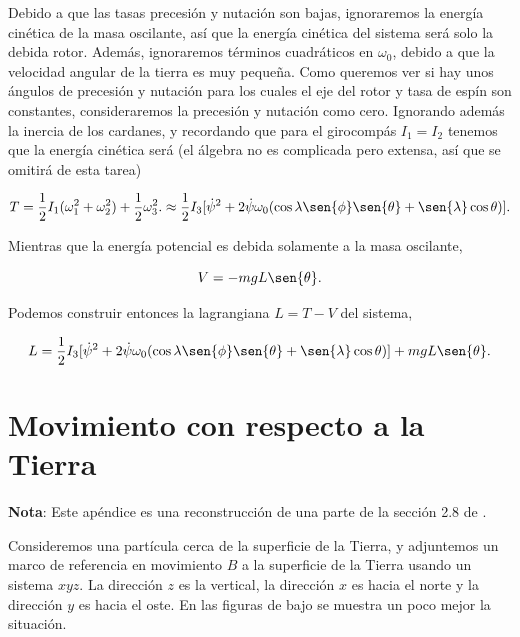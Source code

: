 \documentclass[a4paper,10pt]{article}
\numberwithin{equation}{section}
\begin{document}
Debido a que las tasas precesión y nutación son bajas, ignoraremos la energía 
cinética de la masa oscilante, así que la energía cinética del sistema será solo 
la debida rotor. Además, ignoraremos términos cuadráticos en $\omega_0$, debido a que 
la velocidad angular de la tierra es muy pequeña. Como queremos ver si hay unos 
ángulos de precesión y nutación para los cuales el eje del rotor y tasa de espín 
son constantes, consideraremos la precesión y nutación como cero. Ignorando además 
la inercia de los cardanes, y recordando que para el girocompás $I_1=I_2$ tenemos 
que la energía cinética será (el álgebra no es complicada pero extensa, así que 
se omitirá de esta tarea)

\begin{equation}
 T = \frac{1}{2}I_1 (\omega_1^2 + \omega_2^2) + \frac{1}{2}\omega_3^2. \approx 
 \frac{1}{2}I_3[\dot{\psi}^2 + 2\dot{\psi}\omega_0(\cos{\lambda}\sen{\phi}\sen{\theta} + 
 \sen{\lambda}\cos{\theta})].
\end{equation}

Mientras que la energía potencial es debida solamente a la masa oscilante,

\begin{equation}
 V = - mgL\sen{\theta}.
\end{equation}

Podemos construir entonces la lagrangiana $L = T - V$ del sistema,

\begin{equation}
 L = \frac{1}{2}I_3[\dot{\psi}^2 + 2\dot{\psi}\omega_0(\cos{\lambda}\sen{\phi}\sen{\theta} + 
 \sen{\lambda}\cos{\theta})] + mgL\sen{\theta}.
\end{equation}









\appendix
\appendixpage

\section{Movimiento con respecto a la Tierra} \label{app:apendice1}

\textbf{Nota}: Este apéndice es una reconstrucción de una parte de la sección 2.8 
de \cite{baruh}. 

\vspace{.3cm}

Consideremos una partícula cerca de la superficie de la Tierra, y adjuntemos un marco 
de referencia en movimiento $B$ a la superficie de la Tierra usando un sistema 
$xyz$. La dirección $z$ es la vertical, la dirección $x$ es hacia el norte y la 
dirección $y$ es hacia el oste. En las figuras de bajo se muestra un poco mejor 
la situación.
\end{document}
